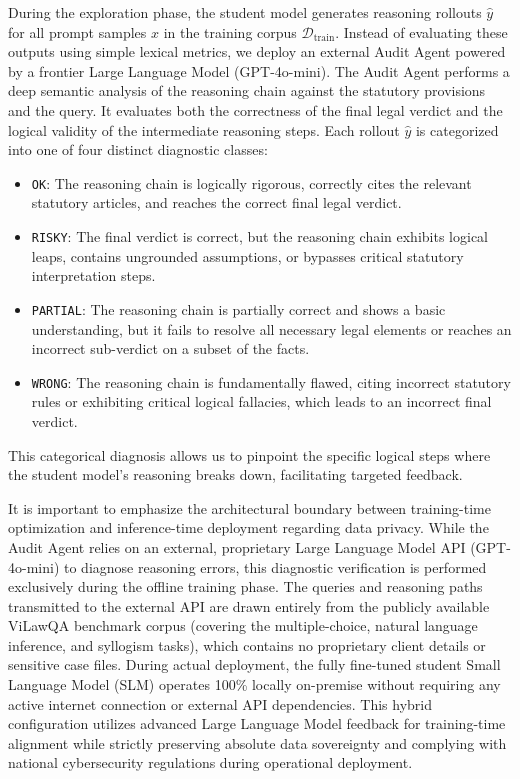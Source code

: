 During the exploration phase, the student model generates reasoning rollouts $\hat{y}$ for all prompt samples $x$ in the training corpus $\mathcal{D}_{\text{train}}$. Instead of evaluating these outputs using simple lexical metrics, we deploy an external Audit Agent powered by a frontier Large Language Model (GPT-4o-mini). The Audit Agent performs a deep semantic analysis of the reasoning chain against the statutory provisions and the query. It evaluates both the correctness of the final legal verdict and the logical validity of the intermediate reasoning steps. Each rollout $\hat{y}$ is categorized into one of four distinct diagnostic classes:
\begin{itemize}
    \item \texttt{OK}: The reasoning chain is logically rigorous, correctly cites the relevant statutory articles, and reaches the correct final legal verdict.
    \item \texttt{RISKY}: The final verdict is correct, but the reasoning chain exhibits logical leaps, contains ungrounded assumptions, or bypasses critical statutory interpretation steps.
    \item \texttt{PARTIAL}: The reasoning chain is partially correct and shows a basic understanding, but it fails to resolve all necessary legal elements or reaches an incorrect sub-verdict on a subset of the facts.
    \item \texttt{WRONG}: The reasoning chain is fundamentally flawed, citing incorrect statutory rules or exhibiting critical logical fallacies, which leads to an incorrect final verdict.
\end{itemize}
This categorical diagnosis allows us to pinpoint the specific logical steps where the student model's reasoning breaks down, facilitating targeted feedback.

It is important to emphasize the architectural boundary between training-time optimization and inference-time deployment regarding data privacy. While the Audit Agent relies on an external, proprietary Large Language Model API (GPT-4o-mini) to diagnose reasoning errors, this diagnostic verification is performed exclusively during the offline training phase. The queries and reasoning paths transmitted to the external API are drawn entirely from the publicly available ViLawQA benchmark corpus (covering the multiple-choice, natural language inference, and syllogism tasks), which contains no proprietary client details or sensitive case files. During actual deployment, the fully fine-tuned student Small Language Model (SLM) operates 100\% locally on-premise without requiring any active internet connection or external API dependencies. This hybrid configuration utilizes advanced Large Language Model feedback for training-time alignment while strictly preserving absolute data sovereignty and complying with national cybersecurity regulations during operational deployment.

